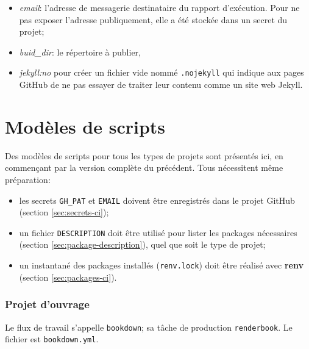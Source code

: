 \documentclass[
  11pt,
  french,
  a4paper,
  extrafontsizes,onecolumn,openright
  ]{memoir}
\providecommand{\tightlist}{%
  \setlength{\itemsep}{0pt}\setlength{\parskip}{0pt}}
\begin{document}
\begin{itemize}
\tightlist
\item
  \emph{email}: l'adresse de messagerie destinataire du rapport d'exécution.
  Pour ne pas exposer l'adresse publiquement, elle a été stockée dans un secret du projet;
\item
  \emph{buid\_dir}: le répertoire à publier,
\item
  \emph{jekyll:no} pour créer un fichier vide nommé \texttt{.nojekyll} qui indique aux pages GitHub de ne pas essayer de traiter leur contenu comme un site web Jekyll.
\end{itemize}

\hypertarget{moduxe8les-de-scripts}{%
\section{Modèles de scripts}\label{moduxe8les-de-scripts}}

Des modèles de scripts pour tous les types de projets sont présentés ici, en commençant par la version complète du précédent.
Tous nécessitent même préparation:

\begin{itemize}
\tightlist
\item
  les secrets \texttt{GH\_PAT} et \texttt{EMAIL} doivent être enregistrés dans le projet GitHub (section \ref{sec:secrets-ci});
\item
  un fichier \texttt{DESCRIPTION} doit être utilisé pour lister les packages nécessaires (section \ref{sec:package-description}), quel que soit le type de projet;
\item
  un instantané des packages installés (\texttt{renv.lock}) doit être réalisé avec \textbf{renv} (section \ref{sec:packages-ci}).
\end{itemize}

\hypertarget{sec:bookdown-ci}{%
\subsubsection{Projet d'ouvrage}\label{sec:bookdown-ci}}

Le flux de travail s'appelle \texttt{bookdown}; sa tâche de production \texttt{renderbook}.
Le fichier est \texttt{bookdown.yml}.
\end{document}
